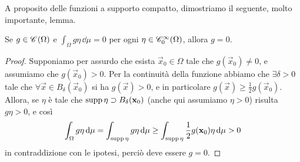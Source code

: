 A proposito delle funzioni a supporto compatto, dimostriamo il seguente, molto importante, lemma.
\begin{lemma} \label{t:fondamentale-calcolo-variazioni}
    Se $g\in\cont{\Omega}$ e $\int_\Omega g\eta\,\dd\mu=0$ per ogni $\eta\in\contsc[\infty]{\Omega}$, allora $g=0$.
\end{lemma}
\begin{proof}
    Supponiamo per assurdo che esista $\vec x_0\in\Omega$ tale che $g(\vec x_0)\ne 0$, e assumiamo che $g(\vec x_0)>0$.
    Per la continuità della funzione abbiamo che $\exists\delta>0$ tale che $\forall\vec x\in B_\delta(\vec x_0)$ si ha $g(\vec x)>0$, e in particolare $g(\vec x)\ge\frac12g(\vec x_0)$.
    Allora, se $\eta$ è tale che $\supp\eta\supset B_\delta(\vec x_0)$ (anche qui assumiamo $\eta>0$) risulta $g\eta>0$, e cos\`i
    \begin{equation}
        \int_\Omega g\eta\,\dd\mu=
        \int_{\supp\eta} g\eta\,\dd\mu\ge
        \int_{\supp\eta} \frac12g(\vec x_0)\eta\,\dd\mu>0
    \end{equation}
    in contraddizione con le ipotesi, perciò deve essere $g=0$.
\end{proof}

